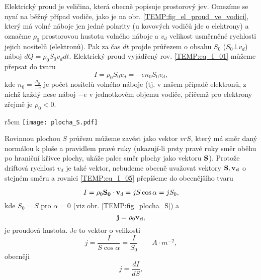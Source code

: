       Elektrický proud je veličina, která obecně popisuje prostorový jev. Omezíme se nyní na běžný
      případ vodiče, jako je na obr. \ref{TEMP:fig_el_proud_ve_vodici}, který má volné náboje jen
      jedné polarity (u kovových vodičů jde o elektrony) a označme $\rho_0$ prostorovou hustotu
      volného náboje a $v_d$ velikost usměrněné rychlosti jejich nositelů (elektronů). Pak za čas
      $dt$ projde průřezem o obsahu $S_0$ ($S_0\bot v_d$) náboj $dQ = \rho_0 S_0 v_d dt$.
      Elektrický proud vyjádřený rov.
      \ref{TEMP:eq_I_01} můžeme přepsat do tvaru
        \begin{equation}\label{TEMP:eq_I_05}
          I = \rho_0 S_0 v_d = - e n_0 S_0 v_d, 
        \end{equation}         
      kde $\displaystyle{n_0 = \frac{\rho_0}{-e}}$ je počet nositelů volného náboje (tj. v našem
      případě elektronů, z nichž každý nese náboj $-e$ v jednotkovém objemu vodiče, přičemž pro
      elektrony zřejmě je $\rho_0<0$.

      \begin{wrapfigure}[14]{r}{5cm}
        \centering
        \texttt{[image: plocha\_S.pdf]}
        \caption[Rovinná plocha $S$.]{Rovinná plocha $S = S_0\cos\alpha$}
        \label{TEMP:fig_plocha_S}
      \end{wrapfigure}
      Rovinnou plochou $S$ průřezu můžeme zavést jako vektor $vr{S}$, který má směr daný normálou k
      ploše a pravidlem pravé ruky (ukazují-li prsty pravé ruky směr oběhu po hraniční křivce
      plochy, ukáže palec směr plochy jako vektoru $\mathbf{S}$). Protože driftová rychlost $v_d$ je
      také vektor, nebudeme obecně uvažovat vektory $\mathbf{S}, \mathbf{v_d}$ o stejném směru a rovnici
      \ref{TEMP:eq_I_05} přepíšeme do obecnějšího tvaru      
      
      \begin{equation}\label{TEMP:eq_I_06}
        I = \rho_0 \mathbf{S_0}\cdot\mathbf{v}_d = jS\cos\alpha = jS_0, 
      \end{equation}      
      kde $S_0 = S$ pro $\alpha = 0$ (viz obr. \ref{TEMP:fig_plocha_S}) a   
      \begin{equation}\label{TEMP:eq_I_07}
        \mathbf{j} = \rho_0\mathbf{v_d}, 
      \end{equation}        
      je proudová hustota. Je to vektor o velikosti 
      \begin{equation}\label{TEMP:eq_I_08}
        j = \frac{I}{S\cos\alpha} = \frac{I}{S_0}  \qquad A\cdot m^{-2}, 
      \end{equation}   
      obecněji
      \begin{equation}\label{TEMP:eq_I_09}
        j = \frac{dI}{dS}, 
      \end{equation}

